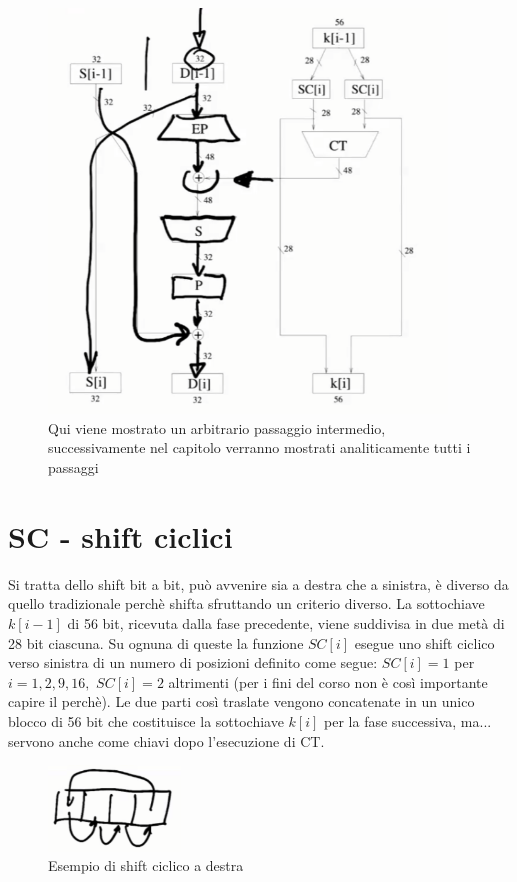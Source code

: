 \begin{figure}[htp]
	\includegraphics[width=300pt]{./img/fase_i_esima_des.png}
	\caption{Qui viene mostrato un arbitrario passaggio intermedio, successivamente nel capitolo verranno mostrati analiticamente tutti i passaggi}
	\label{img:fase_i_esima_des}
\end{figure}

\newpage

\section{SC - shift ciclici}

Si tratta dello shift bit a bit, può avvenire sia a destra che a sinistra, è diverso da quello tradizionale perchè shifta sfruttando un criterio diverso. La sottochiave $k[i - 1]$ di 56 bit, ricevuta dalla fase precedente, viene suddivisa in due metà di 28 bit
ciascuna. Su ognuna di queste la funzione $SC[i]$ esegue uno shift ciclico verso sinistra di un numero di posizioni definito come segue: $SC[i] = 1$ per $i = 1, 2, 9, 16,$
$SC[i] = 2$ altrimenti (per i fini del corso non è così importante capire il perchè). Le due parti così traslate vengono concatenate in un unico blocco di 56 bit che costituisce la sottochiave $k[i]$ per la fase successiva, ma... servono anche come chiavi dopo l'esecuzione di CT.

\begin{figure}[htp]
	\centering
	\includegraphics[width=100pt]{./img/shift_a_destra.png}
	\caption{Esempio di shift ciclico a destra}
	\label{img:shift_a_destra}
\end{figure}

